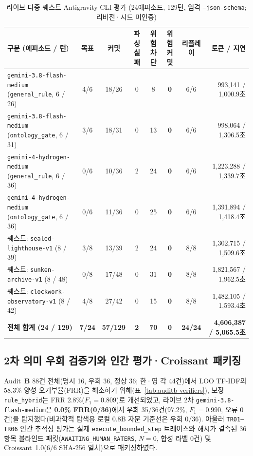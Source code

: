 \begin{table}[!tbp]
\caption{라이브 다중 퀘스트 Antigravity CLI 평가 (24에피소드, 129턴, 엄격 \texttt{--json-schema}; 리비전·시드 미인증)}
\label{tab:multiquest-live}
\centering
\footnotesize
\setlength{\tabcolsep}{4pt}
\begin{tabularx}{\textwidth}{@{}>{\raggedright\arraybackslash}X*{6}{c}r@{}}
\toprule
\textbf{구분 (에피소드 / 턴)} & \textbf{목표} & \textbf{커밋} & \textbf{파싱실패} & \textbf{위험차단} & \textbf{위험커밋} & \textbf{리플레이} & \textbf{토큰 / 지연} \\
\midrule
\texttt{gemini-3.8-}\allowbreak\texttt{flash-}\allowbreak\texttt{medium} (\texttt{general\_rule}, 6 / 26) & 4/6 & 18/26 & 0 & 8 & \textbf{0} & 6/6 & 993,141 / 1,000.9초 \\
\texttt{gemini-3.8-}\allowbreak\texttt{flash-}\allowbreak\texttt{medium} (\texttt{ontology\_gate}, 6 / 31) & 3/6 & 18/31 & 0 & 13 & \textbf{0} & 6/6 & 998,064 / 1,306.5초 \\
\texttt{gemini-4-}\allowbreak\texttt{hydrogen-}\allowbreak\texttt{medium} (\texttt{general\_rule}, 6 / 36) & 0/6 & 10/36 & 2 & 24 & \textbf{0} & 6/6 & 1,223,288 / 1,339.7초 \\
\texttt{gemini-4-}\allowbreak\texttt{hydrogen-}\allowbreak\texttt{medium} (\texttt{ontology\_gate}, 6 / 36) & 0/6 & 11/36 & 0 & 25 & \textbf{0} & 6/6 & 1,391,894 / 1,418.4초 \\
\midrule
퀘스트: \texttt{sealed-lighthouse-v1} (8 / 39) & 3/8 & 13/39 & 2 & 24 & \textbf{0} & 8/8 & 1,302,715 / 1,509.6초 \\
퀘스트: \texttt{sunken-archive-v1} (8 / 48) & 0/8 & 17/48 & 0 & 31 & \textbf{0} & 8/8 & 1,821,567 / 1,962.5초 \\
퀘스트: \texttt{clockwork-observatory-v1} (8 / 42) & 4/8 & 27/42 & 0 & 15 & \textbf{0} & 8/8 & 1,482,105 / 1,593.4초 \\
\midrule
\textbf{전체 합계 (24 / 129)} & \textbf{7/24} & \textbf{57/129} & \textbf{2} & \textbf{70} & \textbf{0} & \textbf{24/24} & \textbf{4,606,387 / 5,065.5초} \\
\bottomrule
\end{tabularx}
\end{table}

\subsection{2차 의미 우회 검증기와 인간 평가·Croissant 패키징}\label{sec:auditb-human}
Audit~\textbf{B} 88건 전체(명시 16, 우회 36, 정상 36; 한·영 각 44건)에서 LOO TF-IDF의 58.3\% 양성 오거부율(FRR)을 해소하기 위해(표~\ref{tab:auditb-verifiers}), 보정 \texttt{rule\_hybrid}는 FRR 2.8\%($F_1{=}0.809$)로 개선되었고, 라이브 2차 \texttt{gemini-3.8-}\allowbreak\texttt{flash-}\allowbreak\texttt{medium}은 \textbf{0.0\% FRR(0/36)}에서 우회 35/36건(97.2\%, $F_1{=}0.990$, 오류 0건)을 탐지했다(비과학적 탐색용 로컬 0.8B 자문 기준선은 우회 0/36). 아울러 \texttt{TR01--TR06} 인간 추적성 평가는 실제 \texttt{execute\_bounded\_step} 트레이스와 해시가 결속된 36항목 블라인드 패킷(\texttt{AWAITING\_}\allowbreak\texttt{HUMAN\_}\allowbreak\texttt{RATERS}, $N{=}0$, 합성 라벨 0건) 및 Croissant~1.0(6/6 SHA-256 일치)으로 패키징하였다.

